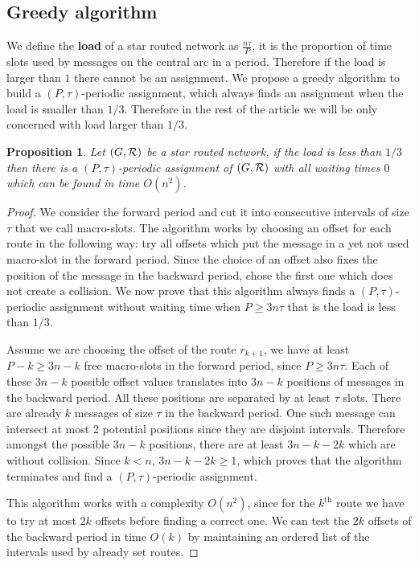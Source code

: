 \documentclass[10pt, conference, letterpaper]{IEEEtran}
\newtheorem{proposition}{Proposition}
\begin{document}
   
    \subsection{Greedy algorithm}
    
    
      We define the \textbf{load} of a star routed network as $\frac{n\tau}{P}$, it is the proportion of time slots used by messages on the central arc in a period. Therefore if the load is larger than $1$ there cannot be an assignment. We propose a greedy algorithm to build a $(P,\tau)$-periodic assignment, which always finds an assignment when the load is smaller than $1/3$. Therefore in the rest of the article we will be only concerned with load larger than $1/3$.
    
    \begin{proposition}
     Let $(G, {\cal R})$ be a star routed network, if the load is less than $1/3$ then there is a $(P,\tau)$-periodic assignment of $(G, {\cal R})$ with all waiting times $0$ which can be found in time $O(n^2)$.
    \end{proposition}
    \begin{proof}
     We consider the forward period and cut it into consecutive intervals of size $\tau$ that we call macro-slots. The algorithm works by choosing an offset for each route in the following way: try all offsets which put the message in a yet not used macro-slot in the forward
     period. Since the choice of an offset also fixes the position of the message in the backward period, chose the first one which does not create a collision. We now prove that this algorithm always finds a $(P,\tau)$-periodic assignment without waiting time when $P \geq 3n\tau$ that is the load is less than $1/3$.
     
     Assume we are choosing the offset of the route $r_{k+1}$, we have at least $P - k \geq 3n - k$ free macro-slots in the forward period, since $P \geq 3n\tau$. Each of these $3n - k$ possible offset values translates into $3n - k$ positions of messages in the backward period. All these positions are separated by at least $\tau$ slots. There are already $k$ messages of size $\tau$ in the backward period. One such message can intersect at most $2$ potential positions since they are disjoint intervals. Therefore  amongst the possible $3n - k$ positions, there are  at least $3n - k -2k$ which are without collision. Since $k < n$, $3n - k -2k \geq 1$, which proves that the algorithm terminates and find a  $(P,\tau)$-periodic assignment. 
     
     This algorithm works with a complexity $O(n^2)$, since for the $k^{\text{th}}$ route we have to try at most $2k$ offsets before finding a correct one. We can test the $2k$ offsets of the backward period in time $O(k)$ by maintaining an ordered list of the intervals used by already set routes.
     \end{proof}
     
\end{document}
